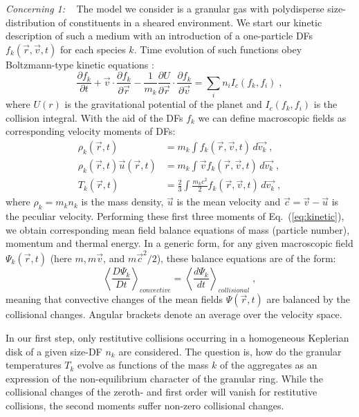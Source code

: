 \documentclass[11pt, notitlepage]{article} %
\begin{document}
\spa
{\em Concerning 1:} ~ The model we consider is a granular gas with polydisperse size-distribution 
of constituents in a sheared environment. We start our kinetic description of such a medium 
with an introduction of a one-particle DFs $f_k(\vec{r}, \vec{v}, t)$ for each species $k$. Time evolution of such functions 
obey Boltzmann-type kinetic equations \citep{Haff1983, Brilliantov2004,spahn2004}:
\begin{equation}
\label{eq:kinetic}
	\frac{\partial f_k}{\partial t}+\vec{v}\cdot\frac{\partial f_k}{\partial\vec{r}}-
	\frac{1}{m_k}\frac{\partial U}{\partial\vec{r}}\cdot\frac{\partial f_k}{\partial\vec{v}}=
	\sum_i n_iI_c(f_k,f_i)\;,
\end{equation}
where $U(r)$ is the gravitational potential of the planet and $I_c(f_k, f_i)$ is the collision integral. With the aid of the  DFs  $f_k$ we 
can define macroscopic fields as corresponding velocity moments of DFs:
\begin{equation}
	\begin{split}
		\rho_k(\vec{r}, t) &= m_k\int f_k(\vec{r}, \vec{v}, t)\,d\vec{v_k}\;,\\
		\rho_k(\vec{r}, t)\vec{u}(\vec{r}, t) &=  m_k \int \vec{v}f_k(\vec{r}, \vec{v}, t)\,d\vec{v_k}\;,\\
		T_k(\vec{r}, t) &= \frac{2}{3}\int \frac{m_k c^2}{2}f_k(\vec{r}, \vec{v}, t)\,d\vec{v_k}\;,
	\end{split}
\end{equation}
where $\rho_k=m_kn_k$ is the mass density, $\vec{u}$ is the mean velocity and $\vec{c}=\vec{v}-\vec{u}$ is the peculiar velocity.
Performing these first three moments of Eq.~(\ref{eq:kinetic}), we obtain corresponding mean field balance equations of mass (particle number),
momentum and thermal energy. In a generic form, for any given macroscopic field $\Psi_k(\vec{r},t)$ (here $m, m \vec v$, and 
$m \vec c^2/2$), these balance equations are of the 
form:
\begin{equation}\label{eq:balance}
	\left\langle\frac{D \Psi_k}{D t}\right\rangle_{convective}=\left\langle\frac{d \Psi_k}{dt}\right\rangle_{collisional}\;,
\end{equation}
meaning that convective changes of the mean fields $\Psi (\vec r, t)$ are balanced by the collisional changes. Angular brackets denote an 
average over the velocity space. 

In our first step, only restitutive collisions occurring in a homogeneous Keplerian disk of a given size-DF $n_k$ are considered. The 
question is, how do the granular temperatures $T_k$ evolve as functions of the mass $k$ of the aggregates as an expression of the 
non-equilibrium character of the granular ring. While the collisional changes of the zeroth- and first order will vanish for restitutive 
collisions, the second moments suffer non-zero collisional changes.
\end{document}
